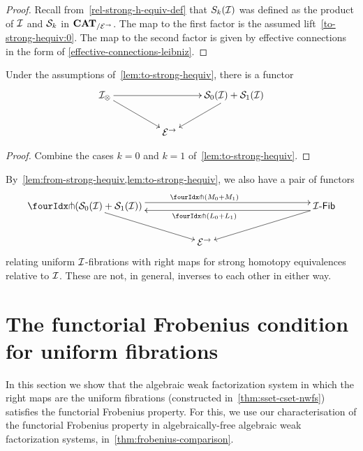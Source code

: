 \documentclass[reqno,10pt,a4paper,oneside,draft]{amsart}
\begin{document}
\begin{proof}
Recall from~\eqref{rel-strong-h-equiv-def} that $S_k(\cal{I})$ was defined as the product of $\cal{I}$ and $\cal{S}_k$ in $\CAT_{/\cal{E}^\to}$.
The map to the first factor is the assumed lift~\eqref{to-strong-hequiv:0}.
The map to the second factor is given by effective connections in the form of \cref{effective-connections-leibniz}.
\end{proof}


\begin{proposition} \label{thm:twodir}
Under the assumptions of~\cref{lem:to-strong-hequiv}, there is a functor 
\[
\xymatrix@!C@C-2.5em{
    \cal{I}_\otimes
  \ar[dr]
  \ar[rr]
&&
\cal{S}_0(\cal{I}) + \cal{S}_1(\cal{I})
  \ar[dl]
\\&
  \catE^\to
}
\]
\end{proposition} 

\begin{proof} Combine the cases $k = 0$ and $k = 1$ of~\cref{lem:to-strong-hequiv}.
\end{proof} 

\begin{remark} \label{relating-strong-hequiv-and-uniform-fib}
By~\cref{lem:from-strong-hequiv,lem:to-strong-hequiv},
we also have a pair of functors
\[
\xymatrix@!C@C-2.5em{
  \liftr{(\cal{S}_0(\cal{I}) + \cal{S}_1(\cal{I}))}
  \ar[dr]
  \ar@<4pt>[rr]^{\liftr{(M_0 + M_1)}}
&&
  \Fib{\cal{I}}
  \ar[dl]
  \ar@<4pt>[ll]^{\liftr{(L_0 + L_1)}}
\\&
  \catE^\to
}
\]
relating uniform $\cal{I}$-fibrations with right maps for strong homotopy equivalences relative to $\cal{I}$. These are not, in general, inverses to each other in either way.
\end{remark}


\section{The functorial Frobenius condition for uniform fibrations}
\label{sec:frocuf}

In this section we show that the algebraic weak factorization system in which the right maps
are the uniform fibrations (constructed in~\cref{thm:sset-cset-nwfs}) satisfies the functorial Frobenius property.
For this, we use our characterisation of the functorial Frobenius property in 
algebraically-free algebraic weak factorization systems, in~\cref{thm:frobenius-comparison}. 
\end{document}
